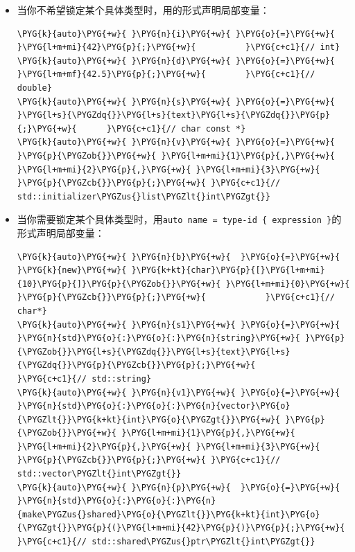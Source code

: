 \begin{itemize}
\item 当你不希望锁定某个具体类型时，用的形式声明局部变量：



\begin{codeblockbg}
\begin{Verbatim}[commandchars=\\\{\},breaklines=true,breakanywhere=true,fontsize=\codefont,xleftmargin=17bp]
\PYG{k}{auto}\PYG{+w}{ }\PYG{n}{i}\PYG{+w}{ }\PYG{o}{=}\PYG{+w}{ }\PYG{l+m+mi}{42}\PYG{p}{;}\PYG{+w}{          }\PYG{c+c1}{// int}
\PYG{k}{auto}\PYG{+w}{ }\PYG{n}{d}\PYG{+w}{ }\PYG{o}{=}\PYG{+w}{ }\PYG{l+m+mf}{42.5}\PYG{p}{;}\PYG{+w}{        }\PYG{c+c1}{// double}
\PYG{k}{auto}\PYG{+w}{ }\PYG{n}{s}\PYG{+w}{ }\PYG{o}{=}\PYG{+w}{ }\PYG{l+s}{\PYGZdq{}}\PYG{l+s}{text}\PYG{l+s}{\PYGZdq{}}\PYG{p}{;}\PYG{+w}{      }\PYG{c+c1}{// char const *}
\PYG{k}{auto}\PYG{+w}{ }\PYG{n}{v}\PYG{+w}{ }\PYG{o}{=}\PYG{+w}{ }\PYG{p}{\PYGZob{}}\PYG{+w}{ }\PYG{l+m+mi}{1}\PYG{p}{,}\PYG{+w}{ }\PYG{l+m+mi}{2}\PYG{p}{,}\PYG{+w}{ }\PYG{l+m+mi}{3}\PYG{+w}{ }\PYG{p}{\PYGZcb{}}\PYG{p}{;}\PYG{+w}{ }\PYG{c+c1}{// std::initializer\PYGZus{}list\PYGZlt{}int\PYGZgt{}}
\end{Verbatim}
\end{codeblockbg}



\item 当你需要锁定某个具体类型时，用\texttt{auto name = type-id \{ expression \}}的形式声明局部变量：



\begin{codeblockbg}
\begin{Verbatim}[commandchars=\\\{\},breaklines=true,breakanywhere=true,fontsize=\codefont,xleftmargin=17bp]
\PYG{k}{auto}\PYG{+w}{ }\PYG{n}{b}\PYG{+w}{  }\PYG{o}{=}\PYG{+w}{ }\PYG{k}{new}\PYG{+w}{ }\PYG{k+kt}{char}\PYG{p}{[}\PYG{l+m+mi}{10}\PYG{p}{]}\PYG{p}{\PYGZob{}}\PYG{+w}{ }\PYG{l+m+mi}{0}\PYG{+w}{ }\PYG{p}{\PYGZcb{}}\PYG{p}{;}\PYG{+w}{            }\PYG{c+c1}{// char*}
\PYG{k}{auto}\PYG{+w}{ }\PYG{n}{s1}\PYG{+w}{ }\PYG{o}{=}\PYG{+w}{ }\PYG{n}{std}\PYG{o}{:}\PYG{o}{:}\PYG{n}{string}\PYG{+w}{ }\PYG{p}{\PYGZob{}}\PYG{l+s}{\PYGZdq{}}\PYG{l+s}{text}\PYG{l+s}{\PYGZdq{}}\PYG{p}{\PYGZcb{}}\PYG{p}{;}\PYG{+w}{         }\PYG{c+c1}{// std::string}
\PYG{k}{auto}\PYG{+w}{ }\PYG{n}{v1}\PYG{+w}{ }\PYG{o}{=}\PYG{+w}{ }\PYG{n}{std}\PYG{o}{:}\PYG{o}{:}\PYG{n}{vector}\PYG{o}{\PYGZlt{}}\PYG{k+kt}{int}\PYG{o}{\PYGZgt{}}\PYG{+w}{ }\PYG{p}{\PYGZob{}}\PYG{+w}{ }\PYG{l+m+mi}{1}\PYG{p}{,}\PYG{+w}{ }\PYG{l+m+mi}{2}\PYG{p}{,}\PYG{+w}{ }\PYG{l+m+mi}{3}\PYG{+w}{ }\PYG{p}{\PYGZcb{}}\PYG{p}{;}\PYG{+w}{ }\PYG{c+c1}{// std::vector\PYGZlt{}int\PYGZgt{}}
\PYG{k}{auto}\PYG{+w}{ }\PYG{n}{p}\PYG{+w}{  }\PYG{o}{=}\PYG{+w}{ }\PYG{n}{std}\PYG{o}{:}\PYG{o}{:}\PYG{n}{make\PYGZus{}shared}\PYG{o}{\PYGZlt{}}\PYG{k+kt}{int}\PYG{o}{\PYGZgt{}}\PYG{p}{(}\PYG{l+m+mi}{42}\PYG{p}{)}\PYG{p}{;}\PYG{+w}{    }\PYG{c+c1}{// std::shared\PYGZus{}ptr\PYGZlt{}int\PYGZgt{}}
\end{Verbatim}
\end{codeblockbg}



\end{itemize}
